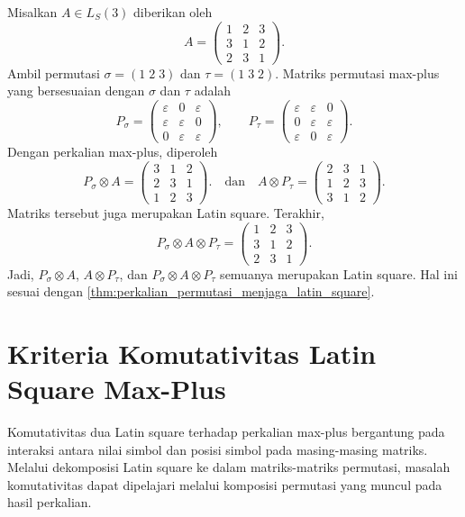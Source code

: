 \begin{contoh}\label{contoh:perkalian_permutasi_menjaga_latin_square}
  Misalkan $A\in L_S(3)$ diberikan oleh
  \[
    A=
    \begin{pmatrix}
      1 & 2 & 3 \\
      3 & 1 & 2 \\
      2 & 3 & 1
    \end{pmatrix}.
  \]
  Ambil permutasi $\sigma=(1\;2\;3)$ dan $\tau=(1\;3\;2)$. Matriks permutasi
  max-plus yang bersesuaian dengan $\sigma$ dan $\tau$ adalah
  \[
    P_\sigma=
    \begin{pmatrix}
      \varepsilon & 0           & \varepsilon \\
      \varepsilon & \varepsilon & 0           \\
      0           & \varepsilon & \varepsilon
    \end{pmatrix},
    \qquad
    P_\tau=
    \begin{pmatrix}
      \varepsilon & \varepsilon & 0           \\
      0           & \varepsilon & \varepsilon \\
      \varepsilon & 0           & \varepsilon
    \end{pmatrix}.
  \]
  Dengan perkalian max-plus, diperoleh
  \[
    P_\sigma\otimes A
    =
    \begin{pmatrix}
      3 & 1 & 2 \\
      2 & 3 & 1 \\
      1 & 2 & 3
    \end{pmatrix}.
    \quad\text{dan}\quad
    A\otimes P_\tau
    =
    \begin{pmatrix}
      2 & 3 & 1 \\
      1 & 2 & 3 \\
      3 & 1 & 2
    \end{pmatrix}.
  \]
  Matriks tersebut juga merupakan Latin square. Terakhir,
  \[
    P_\sigma\otimes A\otimes P_\tau
    =
    \begin{pmatrix}
      1 & 2 & 3 \\
      3 & 1 & 2 \\
      2 & 3 & 1
    \end{pmatrix}.
  \]
  Jadi, $P_\sigma\otimes A$, $A\otimes P_\tau$, dan
  $P_\sigma\otimes A\otimes P_\tau$ semuanya merupakan Latin square. Hal ini
  sesuai dengan \autoref{thm:perkalian_permutasi_menjaga_latin_square}.
\end{contoh}

\section{Kriteria Komutativitas Latin Square Max-Plus}
Komutativitas dua Latin square terhadap perkalian max-plus bergantung pada interaksi antara nilai simbol dan posisi simbol pada masing-masing matriks. Melalui dekomposisi Latin square ke dalam matriks-matriks permutasi, masalah komutativitas dapat dipelajari melalui komposisi permutasi yang muncul pada hasil perkalian.

